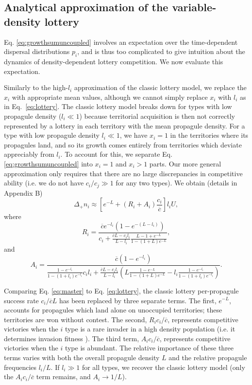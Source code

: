 \documentclass[12pt]{article}
\begin{document}
\subsection*{Analytical approximation of the variable-density lottery}

Eq. \eqref{eq:growthsumuncoupled} involves an expectation over the time-dependent dispersal distributions $p_i$, and is thus too complicated to give intuition about the dynamics of density-dependent lottery competition. We now evaluate this expectation. 

Similarly to the high-$l_i$ approximation of the classic lottery model, we replace the $x_i$ with appropriate mean values, although we cannot simply replace $x_i$ with $l_i$ as in Eq.~\eqref{eq:lottery}. The classic lottery model breaks down for types with low propagule density ($l_i\ll 1$) because territorial acquisition is then not correctly represented by a lottery in each territory with the mean propagule density. For a type with low propagule density $l_i\ll 1$, we have $x_i=1$ in the territories where its propagules land, and so its growth comes entirely from territories which deviate appreciably from $l_i$. To account for this, we separate Eq. \eqref{eq:growthsumuncoupled} into $x_i=1$ and $x_i>1$ parts. Our more general approximation only requires that there are no large discrepancies in competitive ability (i.e. we do not have $c_i/c_j\gg 1$ for any two types). We obtain (details in Appendix B)
\begin{equation}
\Delta_+ n_i\approx \left[e^{-L}+(R_i+A_i)\frac{c_i}{\overline{c}}\right]l_i U, \label{eq:master}
\end{equation}
where
\begin{equation}
R_i=\frac{\overline{c}e^{-l_i}(1-e^{-(L-l_i)})}{c_i +\frac{\overline{c}L- c_il_i}{L-l_i}\frac{L-1+e^{-L}}{1-(1+L)e^{-L}}},\nonumber \label{eq:Dr}
\end{equation}
and
\begin{equation}
A_i=\frac{\overline{c}(1-e^{-l_i})}{\frac{1-e^{-l_i}}{1-(1+l_i)e^{-l_i}}c_il_i+\frac{\overline{c}L- c_il_i}{L-l_i}\left(L\frac{1-e^{-L}}{1-(1+L)e^{-L}}-l_i\frac{1-e^{-l_i}}{1-(1+l_i)e^{-l_i}}\right)}. \nonumber \label{eq:Da}
\end{equation}

Comparing Eq. \eqref{eq:master} to Eq. \eqref{eq:lottery}, the classic lottery per-propagule success rate $c_i/\overline{c}L$ has been replaced by three separate terms. The first, $e^{-L}$, accounts for propagules which land alone on unoccupied territories; these territories are won without contest. The second, $R_i c_i/\overline{c}$, represents competitive victories when the $i$ type is a rare invader in a high density population (i.e. it determines invasion fitness \citep{metz_1992}). The third term, $A_i c_i/\overline{c}$, represents competitive victories when the $i$ type is abundant. The relative importance of these three terms varies with both the overall propagule density $L$ and the relative propagule frequencies $l_i/L$. If $l_i\gg 1$ for all types, we recover the classic lottery model (only the $A_ic_i/\overline{c}$ term remains, and $A_i\rightarrow 1/L$). 
\end{document}
